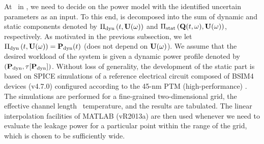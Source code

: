 At \ in , we need to decide on the power model with the identified uncertain parameters as an input.
To this end,  is decomposed into the sum of dynamic and static components denoted by $\oPower{\dyn}{\t, \vU(\o)}$ and $\oPower{\stat}{\vTO(\t, \o), \vU(\o)}$, respectively.
As motivated in the previous subsection, we let $\oPower{\dyn}{\t, \vU(\o)} = \vP_\dyn(\t)$ (does not depend on $\mathbf{U}(\omega)$).
We assume that the desired workload of the system is given a dynamic power profile denoted by $\profilePdyn$.
Without loss of generality, the development of the static part is based on SPICE simulations of a reference electrical circuit composed of BSIM4 devices (v4.7.0) \cite{bsim} configured according to the 45-nm PTM (high-performance) \cite{ptm}.
The simulations are performed for a fine-grained two-dimensional grid, the effective channel length \versus\ temperature, and the results are tabulated.
The linear interpolation facilities of MATLAB (vR2013a) \cite{matlab} are then used whenever we need to evaluate the leakage power for a particular point within the range of the grid, which is chosen to be sufficiently wide.
